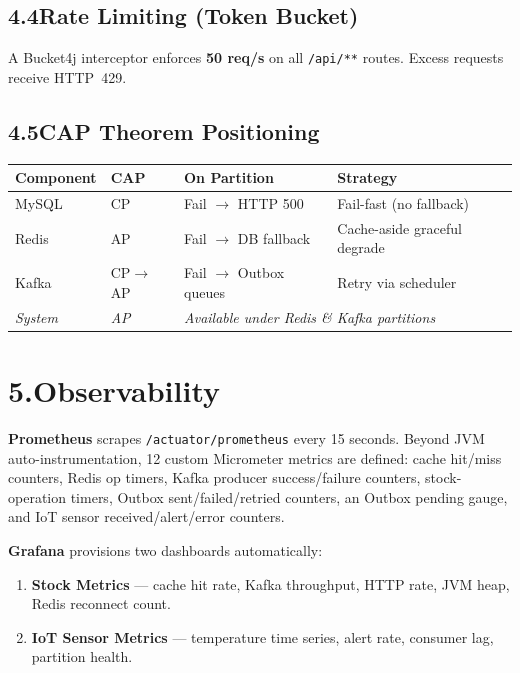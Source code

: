 \documentclass[11pt,a4paper]{article}
\newcommand{\hdr}[1]{\vspace{4pt}\noindent\textcolor{primary}{\textbf{#1}}\quad}
\begin{document}
\subsection*{4.4\quad Rate Limiting (Token Bucket)}

A Bucket4j interceptor enforces \textbf{50 req/s} on all \texttt{/api/**}
routes. Excess requests receive HTTP~429.

\subsection*{4.5\quad CAP Theorem Positioning}

\begin{center}
\small
\begin{tabular}{@{}llll@{}}
\toprule
\textbf{Component} & \textbf{CAP} & \textbf{On Partition} & \textbf{Strategy} \\
\midrule
MySQL  & CP & Fail $\to$ HTTP 500 & Fail-fast (no fallback) \\
Redis  & AP & Fail $\to$ DB fallback & Cache-aside graceful degrade \\
Kafka  & CP$\to$AP & Fail $\to$ Outbox queues & Retry via scheduler \\
\textit{System} & \textit{AP} & \multicolumn{2}{l}{\textit{Available under Redis \& Kafka partitions}} \\
\bottomrule
\end{tabular}
\end{center}

\section*{5.\quad Observability}

\hdr{Prometheus} scrapes \texttt{/actuator/prometheus} every 15 seconds.
Beyond JVM auto-instrumentation, 12 custom Micrometer metrics are defined:
cache hit/miss counters, Redis op timers, Kafka producer success/failure
counters, stock-operation timers, Outbox sent/failed/retried counters,
an Outbox pending gauge, and IoT sensor received/alert/error counters.

\hdr{Grafana} provisions two dashboards automatically:

\begin{enumerate}[noitemsep, leftmargin=1.5cm]
  \item \textbf{Stock Metrics} --- cache hit rate, Kafka throughput, HTTP rate,
        JVM heap, Redis reconnect count.
  \item \textbf{IoT Sensor Metrics} --- temperature time series, alert rate,
        consumer lag, partition health.
\end{enumerate}
\end{document}
